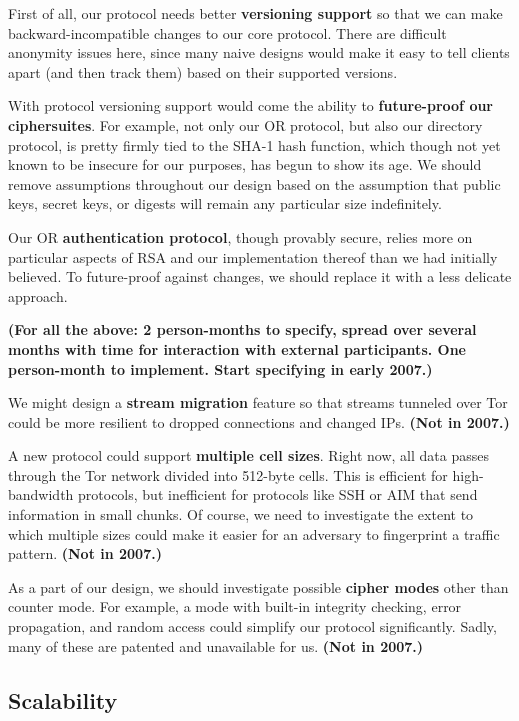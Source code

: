 \documentclass{article}
\newcommand{\plan}[1]{ {\bf (#1)}}
\begin{document}
First of all, our protocol needs better {\bf versioning support} so that we
can make backward-incompatible changes to our core protocol.  There are
difficult anonymity issues here, since many naive designs would make it easy
to tell clients apart (and then track them) based on their supported versions.

With protocol versioning support would come the ability to {\bf future-proof
  our ciphersuites}.  For example, not only our OR protocol, but also our
directory protocol, is pretty firmly tied to the SHA-1 hash function, which
though not yet known to be insecure for our purposes, has begun to show
its age.  We should
remove assumptions throughout our design based on the assumption that public
keys, secret keys, or digests will remain any particular size indefinitely.

Our OR {\bf authentication protocol}, though provably
secure\cite{tap:pet2006}, relies more on particular aspects of RSA and our
implementation thereof than we had initially believed.  To future-proof
against changes, we should replace it with a less delicate approach.

\plan{For all the above: 2 person-months to specify, spread over several
  months with time for interaction with external participants.  One
  person-month to implement.  Start specifying in early 2007.}

We might design a {\bf stream migration} feature so that streams tunneled
over Tor could be more resilient to dropped connections and changed IPs.
\plan{Not in 2007.}

A new protocol could support {\bf multiple cell sizes}.  Right now, all data
passes through the Tor network divided into 512-byte cells.  This is
efficient for high-bandwidth protocols, but inefficient for protocols
like SSH or AIM that send information in small chunks.  Of course, we need to
investigate the extent to which multiple sizes could make it easier for an
adversary to fingerprint a traffic pattern. \plan{Not in 2007.}

As a part of our design, we should investigate possible {\bf cipher modes}
other than counter mode.  For example, a mode with built-in integrity
checking, error propagation, and random access could simplify our protocol
significantly.  Sadly, many of these are patented and unavailable for us.
\plan{Not in 2007.}

\subsection{Scalability}
\end{document}
